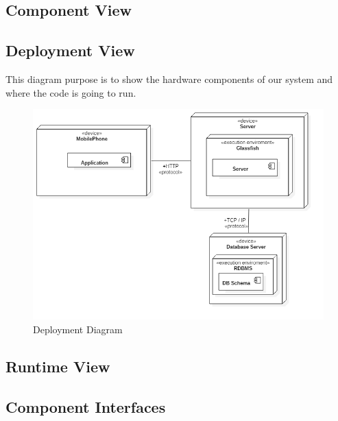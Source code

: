 \clearpage
\subsection{Component View}


\clearpage
\subsection{Deployment View}
This diagram purpose is to show the hardware components of our system and where the code is going to run.
\begin{figure}[!h]
\centering
\includegraphics[scale=0.4]{images/DeploymentDiagram}
\caption{Deployment Diagram}
\label{ref:deploymentdiagram}
\end{figure}

\clearpage
\subsection{Runtime View}

\clearpage
\subsection{Component Interfaces}

\clearpage
